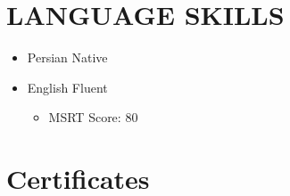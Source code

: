 \documentclass[11pt,a4paper,sans]{moderncv} %
\begin{document}
	
	\section{LANGUAGE SKILLS}
	
	\begin{itemize}
	\item Persian \hspace{5 pt} Native
	\item English \hspace{6 pt} Fluent   
		\begin{itemize}
			 \item MSRT Score: 80
		\end{itemize}
	\end{itemize} 
	\section{Certificates}
    			
    
\end{document}
